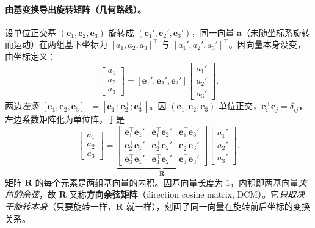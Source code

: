 \paragraph{由基变换导出旋转矩阵（几何路线）。}
设单位正交基 $(\mathbf{e}_1,\mathbf{e}_2,\mathbf{e}_3)$ 旋转成 $(\mathbf{e}_1',\mathbf{e}_2',\mathbf{e}_3')$，同一向量 $\mathbf{a}$（未随坐标系旋转而运动）在两组基下坐标为 $[a_1,a_2,a_3]^\top$ 与 $[a_1',a_2',a_3']^\top$。因向量本身没变，由坐标定义：
\begin{equation}
  [\mathbf{e}_1,\mathbf{e}_2,\mathbf{e}_3]\begin{bmatrix}a_1\\a_2\\a_3\end{bmatrix}
  =[\mathbf{e}_1',\mathbf{e}_2',\mathbf{e}_3']\begin{bmatrix}a_1'\\a_2'\\a_3'\end{bmatrix}.
  \label{eq:rb-samevec}
\end{equation}
两边\emph{左乘} $[\mathbf{e}_1,\mathbf{e}_2,\mathbf{e}_3]^\top=[\mathbf{e}_1^\top;\mathbf{e}_2^\top;\mathbf{e}_3^\top]$。因 $(\mathbf{e}_1,\mathbf{e}_2,\mathbf{e}_3)$ 单位正交，$\mathbf{e}_i^\top\mathbf{e}_j=\delta_{ij}$，左边系数矩阵化为单位阵，于是
\begin{equation}
  \begin{bmatrix}a_1\\a_2\\a_3\end{bmatrix}
  =\underbrace{\begin{bmatrix}\mathbf{e}_1^\top\mathbf{e}_1'&\mathbf{e}_1^\top\mathbf{e}_2'&\mathbf{e}_1^\top\mathbf{e}_3'\\
  \mathbf{e}_2^\top\mathbf{e}_1'&\mathbf{e}_2^\top\mathbf{e}_2'&\mathbf{e}_2^\top\mathbf{e}_3'\\
  \mathbf{e}_3^\top\mathbf{e}_1'&\mathbf{e}_3^\top\mathbf{e}_2'&\mathbf{e}_3^\top\mathbf{e}_3'\end{bmatrix}}_{\mathbf{R}}
  \begin{bmatrix}a_1'\\a_2'\\a_3'\end{bmatrix}.
  \label{eq:R-derive}
\end{equation}
矩阵 $\mathbf{R}$ 的每个元素是两组基向量的内积。因基向量长度为 $1$，内积即两基向量\emph{夹角的余弦}，故 $\mathbf{R}$ 又称\textbf{方向余弦矩阵}（direction cosine matrix, DCM）。它\emph{只取决于旋转本身}（只要旋转一样，$\mathbf{R}$ 就一样），刻画了同一向量在旋转前后坐标的变换关系。

